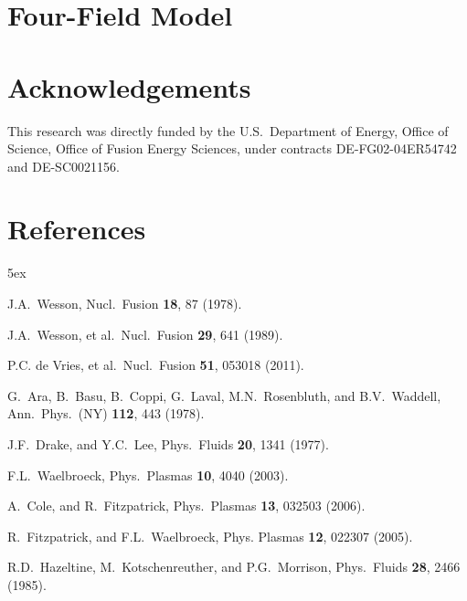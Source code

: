 \documentclass[12pt,prb,aps]{revtex4-1}
\begin{document}
\section{Four-Field Model}

\section*{Acknowledgements}
This research was directly funded by the U.S.\ Department of Energy, Office of Science, Office of Fusion Energy Sciences,  under  contracts DE-FG02-04ER54742 and DE-SC0021156. 

\section*{References}
\begin{thebibliography}{99}\baselineskip 5ex

 J.A.~Wesson, Nucl.\ Fusion {\bf 18}, 87 (1978).

 J.A.~Wesson, et al.\ Nucl.\ Fusion {\bf 29}, 641 (1989).

 P.C. de Vries, et al.\ Nucl.\ Fusion {\bf 51}, 053018 (2011).

 G.~Ara, B.~Basu, B.~Coppi, G.~Laval, M.N.~Rosenbluth, and B.V.~Waddell, Ann.\ Phys.\ (NY) {\bf 112}, 443 (1978).

 J.F.~Drake, and Y.C.~Lee, Phys.\ Fluids {\bf 20}, 1341 (1977).

 F.L.~Waelbroeck, Phys.\ Plasmas {\bf 10}, 4040 (2003).

 A.~Cole, and R.~Fitzpatrick, Phys.\ Plasmas {\bf 13}, 032503 (2006).

 R.~Fitzpatrick, and F.L.~Waelbroeck, Phys. Plasmas {\bf 12}, 022307 (2005).

 R.D.~Hazeltine, M.~Kotschenreuther, and P.G.~Morrison, Phys.\ Fluids {\bf 28}, 2466 (1985).

\end{thebibliography}

\end{document}
